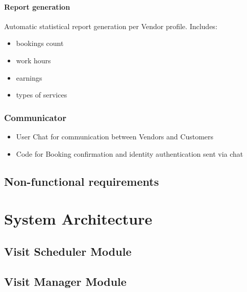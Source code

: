 \documentclass[11pt,a4paper]{article}
\begin{document}
\paragraph{Report generation}

Automatic statistical report generation per Vendor profile. Includes:
\begin{itemize}
  \item bookings count
  \item work hours
  \item earnings
  \item types of services
\end{itemize}

\subsubsection{Communicator}
\begin{itemize}
  \item User Chat for communication between Vendors and Customers
  \item Code for Booking confirmation and identity authentication sent via chat
\end{itemize}

\subsection{Non-functional requirements}

\section{System Architecture}

\subsection{Visit Scheduler Module}

\subsection{Visit Manager Module}
\end{document}
